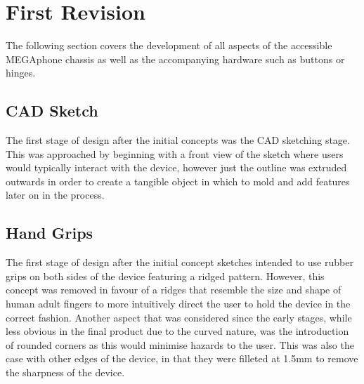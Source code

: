 

\section{First Revision}

The following section covers the development of all aspects of the accessible MEGAphone chassis as well as the accompanying hardware such as buttons or hinges.

\subsection{CAD Sketch}

The first stage of design after the initial concepts was the CAD sketching stage.
This was approached by beginning with a front view of the sketch where users would typically interact with the device, however just the outline was extruded outwards in order to create a tangible object in which to mold and add features later on in the process.


\subsection{Hand Grips}

The first stage of design after the initial concept sketches intended to use rubber grips on both sides of the device featuring a ridged pattern.
However, this concept was removed in favour of a ridges that resemble the size and shape of human adult fingers to more intuitively direct the user to hold the device in the correct fashion.
Another aspect that was considered since the early stages, while less obvious in the final product due to the curved nature, was the introduction of rounded corners as this would minimise hazards to the user.
This was also the case with other edges of the device, in that they were filleted at 1.5mm to remove the sharpness of the device.

